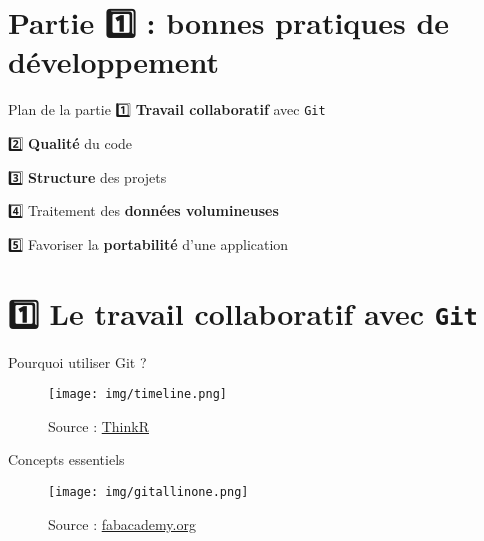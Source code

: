 \documentclass[
  ignorenonframetext,
]{beamer}
\begin{document}
\section{\texorpdfstring{Partie {1️⃣} : bonnes pratiques de
développement}{Partie 1️⃣ : bonnes pratiques de développement}}\label{partie-1-bonnes-pratiques-de-duxe9veloppement}

\begin{frame}[fragile]{Plan de la partie}
\label{plan-de-la-partie}
{1️⃣} {\textbf{Travail collaboratif}} avec \texttt{Git}

{2️⃣} {\textbf{Qualité}} du code

{3️⃣} {\textbf{Structure}} des projets

{4️⃣} Traitement des {\textbf{données volumineuses}}

{5️⃣} Favoriser la {\textbf{portabilité}} d'une application
\end{frame}

\section{\texorpdfstring{{1️⃣} Le travail collaboratif avec
\texttt{Git}}{1️⃣ Le travail collaboratif avec Git}}\label{le-travail-collaboratif-avec-git}

\begin{frame}{Pourquoi utiliser Git ?}
\label{pourquoi-utiliser-git}
\begin{figure}[H]

{\centering \texttt{[image: img/timeline.png]}

}

\caption{Source :
\href{https://thinkr.fr/travailler-avec-git-via-rstudio-et-versionner-son-code/}{ThinkR}}

\end{figure}%
\end{frame}

\begin{frame}{Concepts essentiels}
\label{concepts-essentiels}
\begin{figure}[H]

{\centering \texttt{[image: img/gitallinone.png]}

}

\caption{Source :
\href{http://fabacademy.org/2021/labs/bhubaneswar/students/deepak-chaudhry/ia_PPFP.html}{fabacademy.org}}

\end{figure}%
\end{frame}
\end{document}
